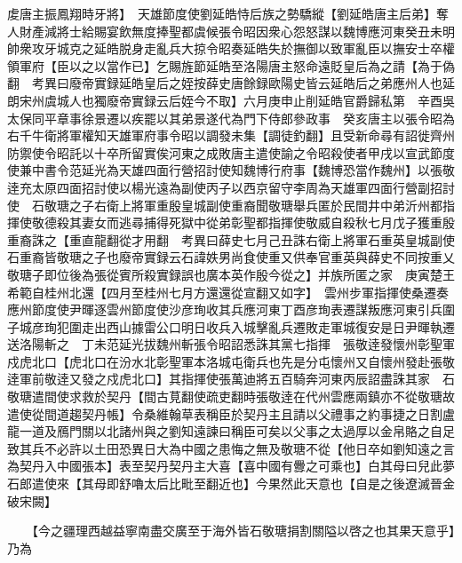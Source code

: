 䖍唐主振鳳翔時牙將】　天雄節度使劉延皓恃后族之勢驕縱【劉延皓唐主后弟】奪人財產減將士給賜宴飲無度捧聖都虞候張令昭因衆心怨怒謀以魏博應河東癸丑未明帥衆攻牙城克之延皓脱身走亂兵大掠令昭奏延皓失於撫御以致軍亂臣以撫安士卒權領軍府【臣以之以當作已】乞賜旌節延皓至洛陽唐主怒命遠貶皇后為之請【為于偽翻　考異曰廢帝實録延皓皇后之姪按薛史唐餘録歐陽史皆云延皓后之弟應州人也延朗宋州虞城人也獨廢帝實録云后姪今不取】六月庚申止削延皓官爵歸私第　辛酉吳太保同平章事徐景遷以疾罷以其弟景遂代為門下侍郎參政事　癸亥唐主以張令昭為右千牛衛將軍權知天雄軍府事令昭以調發未集【調徒釣翻】且受新命尋有詔徙齊州防禦使令昭託以十卒所留實俟河東之成敗唐主遣使諭之令昭殺使者甲戌以宣武節度使兼中書令范延光為天雄四面行營招討使知魏博行府事【魏博恐當作魏州】以張敬逹充太原四面招討使以楊光遠為副使丙子以西京留守李周為天雄軍四面行營副招討使　石敬瑭之子右衛上將軍重殷皇城副使重裔聞敬瑭舉兵匿於民間井中弟沂州都指揮使敬德殺其妻女而逃尋捕得死獄中從弟彰聖都指揮使敬威自殺秋七月戊子獲重殷重裔誅之【重直龍翻從才用翻　考異曰薛史七月己丑誅右衛上將軍石重英皇城副使石重裔皆敬瑭之子也廢帝實録云石諱妷男尚食使重又供奉官重英與薛史不同按重乂敬瑭子即位後為張從賓所殺實録誤也廣本英作殷今從之】并族所匿之家　庚寅楚王希範自桂州北還【四月至桂州七月方還還從宣翻又如字】　雲州步軍指揮使桑遷奏應州節度使尹暉逐雲州節度使沙彦珣收其兵應河東丁酉彦珣表遷謀叛應河東引兵圍子城彦珣犯圍走出西山據雷公口明日收兵入城擊亂兵遷敗走軍城復安是日尹暉執遷送洛陽斬之　丁未范延光拔魏州斬張令昭詔悉誅其黨七指揮　張敬逹發懷州彰聖軍戍虎北口【虎北口在汾水北彰聖軍本洛城屯衛兵也先是分屯懷州又自懷州發赴張敬逹軍前敬逹又發之戍虎北口】其指揮使張萬迪將五百騎奔河東丙辰詔盡誅其家　石敬瑭遣間使求救於契丹【間古莧翻使疏吏翻時張敬逹在代州雲應兩鎮亦不從敬瑭故遣使從間道趨契丹帳】令桑維翰草表稱臣於契丹主且請以父禮事之約事捷之日割盧龍一道及鴈門關以北諸州與之劉知遠諫曰稱臣可矣以父事之太過厚以金帛賂之自足致其兵不必許以土田恐異日大為中國之患悔之無及敬瑭不從【他日卒如劉知遠之言為契丹入中國張本】表至契丹契丹主大喜【喜中國有釁之可乘也】白其母曰兒此夢石郎遣使來【其母即舒嚕太后比毗至翻近也】今果然此天意也【自是之後遼滅晉金破宋闕】

　　【今之疆理西越益寧南盡交廣至于海外皆石敬瑭捐割關隘以啓之也其果天意乎】乃為

